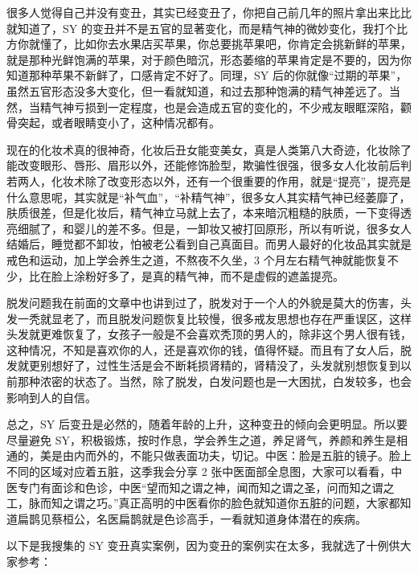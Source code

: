 \documentclass{ctexart}
\begin{document}
很多人觉得自己并没有变丑，其实已经变丑了，你把自己前几年的照片拿出来比比就知道了，SY 的变丑并不是五官的显著变化，而是精气神的微妙变化，我打个比方你就懂了，比如你去水果店买苹果，你总要挑苹果吧，你肯定会挑新鲜的苹果，就是那种光鲜饱满的苹果，对于颜色暗沉，形态萎缩的苹果肯定是不要的，因为你知道那种苹果不新鲜了，口感肯定不好了。同理，SY 后的你就像“过期的苹果”，虽然五官形态没多大变化，但一看就知道，和过去那种饱满的精气神差远了。当然，当精气神亏损到一定程度，也是会造成五官的变化的，不少戒友眼眶深陷，颧骨突起，或者眼睛变小了，这种情况都有。

现在的化妆术真的很神奇，化妆后丑女能变美女，真是人类第八大奇迹，化妆除了能改变眼形、唇形、眉形以外，还能修饰脸型，欺骗性很强，很多女人化妆前后判若两人，化妆术除了改变形态以外，还有一个很重要的作用，就是“提亮”，提亮是什么意思呢，其实就是“补气血”，“补精气神”，很多女人其实精气神已经萎靡了，肤质很差，但是化妆后，精气神立马就上去了，本来暗沉粗糙的肤质，一下变得透亮细腻了，和婴儿的差不多。但是，一卸妆又被打回原形，所以有听说，很多女人结婚后，睡觉都不卸妆，怕被老公看到自己真面目。而男人最好的化妆品其实就是戒色和运动，加上学会养生之道，不熬夜不久坐，3 个月左右精气神就能恢复不少，比在脸上涂粉好多了，是真的精气神，而不是虚假的遮盖提亮。

脱发问题我在前面的文章中也讲到过了，脱发对于一个人的外貌是莫大的伤害，头发一秃就显老了，而且脱发问题恢复比较慢，很多戒友思想也存在严重误区，这样头发就更难恢复了，女孩子一般是不会喜欢秃顶的男人的，除非这个男人很有钱，这种情况，不知是喜欢你的人，还是喜欢你的钱，值得怀疑。而且有了女人后，脱发就更别想好了，过性生活是会不断耗损肾精的，肾精没了，头发就别想恢复到以前那种浓密的状态了。当然，除了脱发，白发问题也是一大困扰，白发较多，也会影响到人的自信。

总之，SY 后变丑是必然的，随着年龄的上升，这种变丑的倾向会更明显。所以要尽量避免 SY，积极锻炼，按时作息，学会养生之道，养足肾气，养颜和养生是相通的，美是由内而外的，不能只做表面功夫，切记。中医：脸是五脏的镜子。脸上不同的区域对应着五脏，这季我会分享 2 张中医面部全息图，大家可以看看，中医专门有面诊和色诊，中医“望而知之谓之神，闻而知之谓之圣，问而知之谓之工，脉而知之谓之巧。”真正高明的中医看你的脸色就知道你五脏的问题，大家都知道扁鹊见蔡桓公，名医扁鹊就是色诊高手，一看就知道身体潜在的疾病。

以下是我搜集的 SY 变丑真实案例，因为变丑的案例实在太多，我就选了十例供大家参考：
\end{document}
